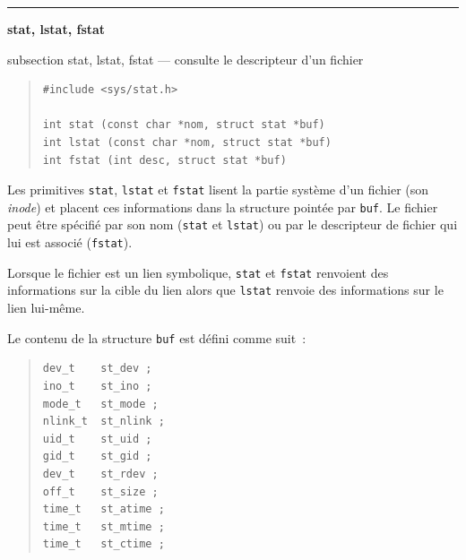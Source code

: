 \documentclass [twoside] {report}
\newcommand {\primitive} [1]
    {
	\phantomsection
	{\large \textbf {#1}}
	\addcontentsline {toc} {subsection} {#1}
    }
\newcommand {\separation}
    {
	\vspace {5mm}
	\nopagebreak
	\hrule
    }
\begin{document}
\separation
\primitive {stat, lstat, fstat} --- consulte le descripteur d'un fichier
    \label {stat}

\begin {quote}
\begin {verbatim}
#include <sys/stat.h>

int stat (const char *nom, struct stat *buf)
int lstat (const char *nom, struct stat *buf)
int fstat (int desc, struct stat *buf)
\end{verbatim}
\end {quote}

Les primitives \texttt {stat}, \texttt {lstat} et \texttt {fstat} lisent la partie
système d'un fichier (son \textit {inode}) et placent ces informations dans
la structure pointée par \texttt {buf}. Le fichier peut être spécifié
par son nom (\texttt {stat} et \texttt {lstat}) ou par le descripteur de fichier
qui lui est associé (\texttt {fstat}).

Lorsque le fichier est un lien symbolique, \texttt {stat} et \texttt {fstat}
renvoient des informations sur la cible du lien alors que \texttt {lstat}
renvoie des informations sur le lien lui-même.

Le contenu de la structure \texttt {buf} est défini
comme suit~:

\begin {quote}
\begin {verbatim}
dev_t    st_dev ;
ino_t    st_ino ;
mode_t   st_mode ;
nlink_t  st_nlink ;
uid_t    st_uid ;
gid_t    st_gid ;
dev_t    st_rdev ;
off_t    st_size ;
time_t   st_atime ;
time_t   st_mtime ;
time_t   st_ctime ;
\end{verbatim}
\end {quote}
\end{document}
